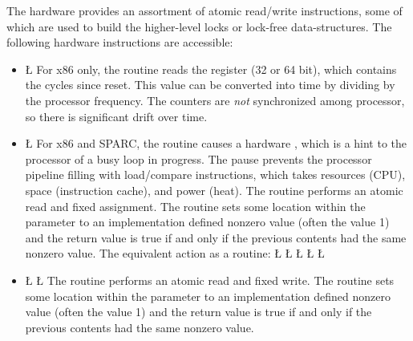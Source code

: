 \documentclass[openright,twoside]{report}
\begin{document}
The hardware provides an assortment of atomic read/write instructions, some of which are used to build the higher-level locks or lock-free data-structures.
The following hardware instructions are accessible:
\begin{itemize}
\item
{\LGindent=0pt
\LGinlinefalse\LGbegin\lgrinde
\L{}
\CE{}\endlgrinde\LGend
}%
For x86 only, the routine reads the  register (32 or 64 bit), which contains the cycles since reset.
This value can be converted into time by dividing by the processor frequency.
The counters are \emph{not} synchronized among processor, so there is significant drift over time.
\item
{\LGindent=0pt
\LGinlinefalse\LGbegin\lgrinde
\L{}
\endlgrinde\LGend
}%
For x86 and SPARC, the routine causes a hardware , which is a hint to the processor of a busy loop in progress.
The pause prevents the processor pipeline filling with load/compare instructions, which takes resources (CPU), space (instruction cache), and power (heat).
The  routine performs an atomic read and fixed assignment.
The routine sets some location within the parameter to an implementation defined nonzero value (often the value 1) and the return value is true if and only if the previous contents had the same nonzero value.
The equivalent action as a \Index[C++]{\CC} routine:
\LGinlinefalse\LGbegin\lgrinde
\L{}
\CE{}\L{\LB{}}
\CE{}\L{\LB{}}
\CE{}\L{\LB{}}
\CE{}\L{\LB{\}}}
\endlgrinde\LGend
\item
{\LGindent=0pt
\LGinlinefalse\LGbegin\lgrinde
\L{}
\L{}
\endlgrinde\LGend
}%
The  routine performs an atomic read and fixed write.
The routine sets some location within the parameter to an implementation defined nonzero value (often the value 1) and the return value is true if and only if the previous contents had the same nonzero value.

\end{itemize}
\end{document}
